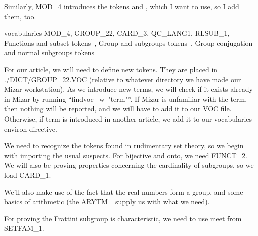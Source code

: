Similarly, {\Tt{}MOD{\_}4\nwendquote} introduces the tokens {\Tt{}\nwendquote} and
{\Tt{}\nwendquote}, which I want to use, so I add them, too.

\nwenddocs{}\endmoddef\nwstartdeflinemarkup{}\nwenddeflinemarkup
vocabularies MOD_4, GROUP_22, CARD_3, QC_LANG1, RLSUB_1,
  \LA{}Functions and subset tokens~{\nwtagstyle{}}\RA{},
  \LA{}Group and subgroups tokens~{\nwtagstyle{}}\RA{},
  \LA{}Group conjugation and normal subgroups tokens~{\nwtagstyle{}}\RA{}
\nwendcode{}\nwdocspar

\begin{remark}
For our article, we will need to define new tokens. They are placed in
{\Tt{}./DICT/GROUP{\_}22.VOC\nwendquote} (relative to whatever directory we have made our
Mizar workstation). As we introduce new terms, we will check if it
exists already in Mizar by running ``{\Tt{}findvoc\ -w\ "term"\nwendquote}''. If Mizar
is unfamiliar with the term, then nothing will be reported, and we will
have to add it to our {\Tt{}VOC\nwendquote} file. Otherwise, if {\Tt{}term\nwendquote} is introduced
in another article, we add it to our {\Tt{}vocabularies\nwendquote} environ directive.
\end{remark}

We need to recognize the tokens found in rudimentary set theory, so we
begin with importing the usual suspects. For {\Tt{}bijective\nwendquote} and {\Tt{}onto\nwendquote},
we need {\Tt{}FUNCT{\_}2\nwendquote}. We will also be proving properties concerning the
cardinality of subgroups, so we load {\Tt{}CARD{\_}1\nwendquote}.

We'll also make use of the fact that the real numbers form a group, and
some basics of arithmetic (the {\Tt{}ARYTM{\_}\nwendquote} supply us with what we need).

For proving the Frattini subgroup is characteristic, we need to use
{\Tt{}meet\nwendquote} from {\Tt{}SETFAM{\_}1\nwendquote}.

